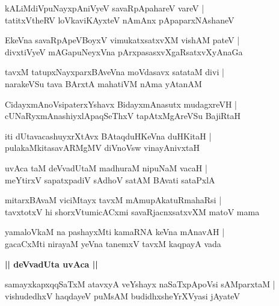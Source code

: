 \documentclass[twoside,12pt,openright]{book}
\newcounter{shloka}[chapter]
\def\uvaca#1{\centerline{{\large\textbf{#1}}}}
\begin{document}
\begin{shloka}
kALiMdiVpuNayxpAniVyeV savaRpApahareV vareV |\\
tatitxVtheRV loVkaviKAyxteV nAmAnx pApaparxNAshaneV 
\end{shloka}

\begin{shloka}
EkeVna savaRpApeVBoyxV vimukatxsatxvXM vishAM pateV |\\
divxtiVyeV mAGapuNeyxVna pArxpasasxvXgaRsatxvXyAnaGa 
\end{shloka}

\begin{shloka}
tavxM  tatupxNayxparxBAveVna moVdasavx satataM divi |\\
narakeVSu tava BArxtA mahatiVM nAma yAtanAM 
\end{shloka}

\begin{shloka}
CidayxmAnoVsipaterxYshavx BidayxmAnasutx mudagxreVH |\\
cUNaRyxmAnashiyxlApaqSeThxV tapAtxMgAreVSu BajiRtaH 
\end{shloka}

\begin{shloka}
iti dUtavacashuyxrXtAvx BAtaqduHKeVna duHKitaH |\\
pulakaMkitasavARMgMV diVnoVsw vinayAnivxtaH 
\end{shloka}

\begin{shloka}
uvAca taM deVvadUtaM madhuraM nipuNaM vacaH |\\
meYtirxV sapatxpadiV sAdhoV satAM  BAvati sataPxlA
\end{shloka}

\begin{shloka}
mitarxBAvaM viciMtayx tavxM mAmupAkatuRmahaRsi |\\
tavxtotxV hi shorxVtumicACxmi savaRjacnxsatxvXM matoV mama
\end{shloka}

\begin{shloka}
yamaloVkaM na pashayxMti kamaRNA keVna mAnavAH |\\
gacaCxMti nirayaM yeVna tanemxV tavxM kaqpayA vada 
\end{shloka}

\uvaca{|| deVvadUta uvAca ||}

\begin{shloka}
samayxkapxqqSaTxM atavxyA veYshayx naSaTxpApoVsi sAMparxtaM |\\
vishudedhxV haqdayeV puMsAM budidhxsheYrXVyasi jAyateV
\end{shloka}
\end{document}
